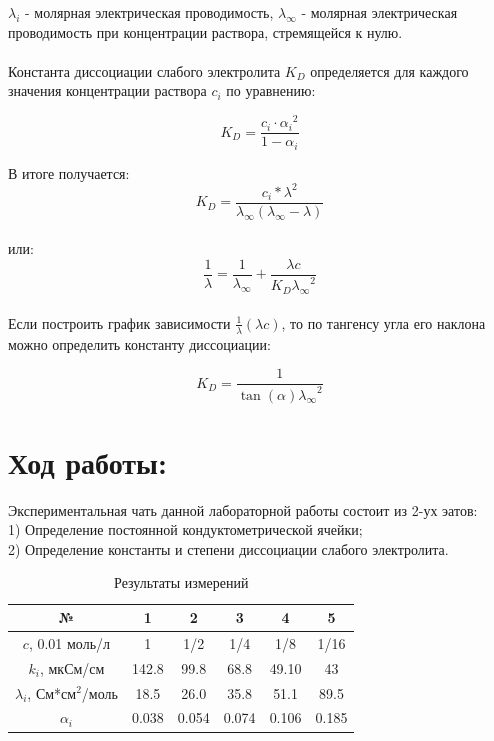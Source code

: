 \documentclass[a4paper,12pt]{article} %
\begin{document}
$\lambda_{i}$ - молярная электрическая проводимость, $\lambda_{\infty}$ - молярная электрическая проводимость при концентрации раствора, стремящейся к нулю.

\paragraph{}
Константа диссоциации слабого электролита $K_{D}$ определяется для каждого значения концентрации раствора $c_{i}$ по уравнению:

\begin{equation}
    K_{D} = \frac{c_i \cdot {\alpha_{i}}^2}{1-\alpha_{i}}
\end{equation}

В итоге получается:
\begin{equation}
    K_D = \frac{c_i * {\lambda}^2}{\lambda_{\infty}(\lambda_{\infty}-\lambda)}
\end{equation}
\\или:
\begin{equation}
    \frac{1}{\lambda} = \frac{1}{\lambda_{\infty}} + \frac{\lambda c}{K_D {\lambda_{\infty}}^2}
\end{equation}

\paragraph{}
Если построить график зависимости $\frac{1}{\lambda} (\lambda c)$, то по тангенсу угла его наклона можно  определить константу диссоциации:

\begin{equation}
    K_D = \frac{1}{\tan({\alpha}){\lambda_{\infty}}^2}
\end{equation}

\section{Ход работы:}
Экспериментальная чать данной лабораторной работы состоит из 2-ух эатов:
\\ 1) Определение постоянной кондуктометрической ячейки;
\\ 2) Определение константы и степени диссоциации слабого электролита.
\newpage
    \begin{table}[h]
    \centering
    \begin{tabular}{|c|c|c|c|c|c|}
    \hline
        № & 1 & 2 & 3 & 4 & 5 \\ \hline
        $c$, 0.01 моль/л & 1 & 1/2 & 1/4 & 1/8 & 1/16 \\ \hline
        $k_{i}$, мкСм/см & 142.8 & 99.8 & 68.8 & 49.10 & 43 \\ \hline
        $\lambda_{i}$, См*см$^2$/моль & 18.5 & 26.0 & 35.8 & 51.1 & 89.5 \\ \hline
        $\alpha_{i}$ & 0.038& 0.054& 0.074& 0.106 & 0.185 \\ \hline
    \end{tabular}
    \caption{Результаты измерений}
    \label{table_Delta_nu,tau}
    \end{table}
\end{document}
